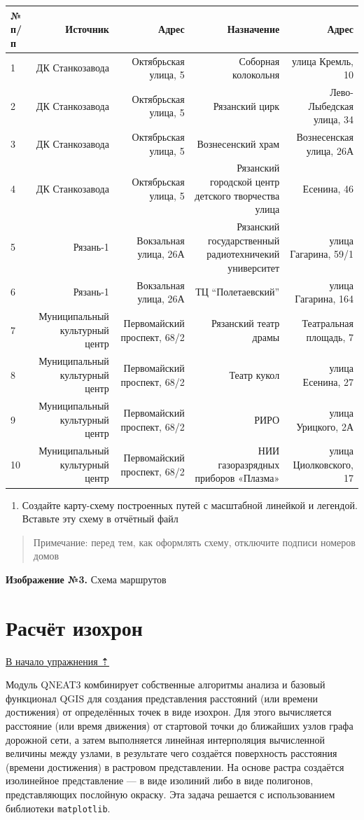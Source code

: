\documentclass[
  12pt,
]{book}
\providecommand{\tightlist}{%
  \setlength{\itemsep}{0pt}\setlength{\parskip}{0pt}}
\begin{document}
\begin{longtable}[]{@{}lrrrr@{}}
\toprule
№ п/п & Источник & Адрес & Назначение & Адрес\tabularnewline
\midrule
\endhead
1 & ДК Станкозавода & Октябрьская улица, 5 & Соборная колокольня & улица Кремль, 10\tabularnewline
2 & ДК Станкозавода & Октябрьская улица, 5 & Рязанский цирк & Лево-Лыбедская улица, 34\tabularnewline
3 & ДК Станкозавода & Октябрьская улица, 5 & Вознесенский храм & Вознесенская улица, 26А\tabularnewline
4 & ДК Станкозавода & Октябрьская улица, 5 & Рязанский городской центр детского творчества улица & Есенина, 46\tabularnewline
5 & Рязань-1 & Вокзальная улица, 26А & Рязанский государственный радиотехничекий университет & улица Гагарина, 59/1\tabularnewline
6 & Рязань-1 & Вокзальная улица, 26А & ТЦ ``Полетаевский'' & улица Гагарина, 164\tabularnewline
7 & Муниципальный культурный центр & Первомайский проспект, 68/2 & Рязанский театр драмы & Театральная площадь, 7\tabularnewline
8 & Муниципальный культурный центр & Первомайский проспект, 68/2 & Театр кукол & улица Есенина, 27\tabularnewline
9 & Муниципальный культурный центр & Первомайский проспект, 68/2 & РИРО & улица Урицкого, 2А\tabularnewline
10 & Муниципальный культурный центр & Первомайский проспект, 68/2 & НИИ газоразрядных приборов «Плазма» & улица Циолковского, 17\tabularnewline
\bottomrule
\end{longtable}

\begin{enumerate}
\def\labelenumi{\arabic{enumi}.}
\setcounter{enumi}{17}
\tightlist
\item
  Создайте карту-схему построенных путей с масштабной линейкой и легендой. Вставьте эту схему в отчётный файл
\end{enumerate}

\begin{quote}
Примечание: перед тем, как оформлять схему, отключите подписи номеров домов
\end{quote}

\textbf{Изображение №3.} Схема маршрутов

\hypertarget{networks-isochrones}{%
\section{Расчёт изохрон}\label{networks-isochrones}}

\protect\hyperlink{networks}{В начало упражнения ⇡}

Модуль QNEAT3 комбинирует собственные алгоритмы анализа и базовый функционал QGIS для создания представления расстояний (или времени достижения) от определённых точек в виде изохрон. Для этого вычисляется расстояние (или время движения) от стартовой точки до ближайших узлов графа дорожной сети, а затем выполняется линейная интерполяция вычисленной величины между узлами, в результате чего создаётся поверхность расстояния (времени достижения) в растровом представлении. На основе растра создаётся изолинейное представление --- в виде изолиний либо в виде полигонов, представляющих послойную окраску. Эта задача решается с использованием библиотеки \texttt{matplotlib}.
\end{document}
